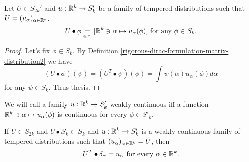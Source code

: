 \documentclass[main.tex]{subfiles}
\begin{document}
\begin{theorem}
\label{almost-tempered-representation}
Let $U\in S_{2k}'$ and $u:\mathbb{R}^k\to S_k'$ be a family of tempered distributions such that $U = (u_\alpha)_{\alpha\in\mathbb{R}^k}$.
\begin{equation}
U\bullet \phi \underset{\text{a.e.}}{=} [\mathbb{R}^k\ni\alpha\mapsto u_\alpha(\phi)] \text{ for any } \phi\in S_k.
\end{equation}
\begin{proof}
Let's fix $\phi\in S_k$. By Definition \ref{rigorous-dirac-formulation-matrix-distribution2} we have
\begin{equation}
(U\bullet\phi)(\psi) = (U^T\bullet\psi)(\phi) = \int \psi(\alpha) u_\alpha(\phi) d\alpha 
\end{equation}
for any $\psi\in S_k$. Thus thesis.
\end{proof}
\end{theorem}
\begin{definition}
We will call a family $u:\mathbb{R}^k\to S'_k$ weakly continuous iff
a function $\mathbb{R}^k\ni\alpha\mapsto u_\alpha(\phi)$ is continuous for every $\phi\in S'_k$. 
\end{definition}
\begin{theorem}
If $U\in S_{2k}$ and $U\bullet S_k \subset S_k$ and $u:\mathbb{R}^k\to S'_k$ is a weakly continuous family of tempered distributions such that $(u_\alpha)_{\alpha\in\mathbb{R}^k} = U$, then 
\begin{equation}
U^T \bullet \delta_\alpha = u_\alpha \text{ for every } \alpha\in\mathbb{R}^k.
\end{equation}
\end{theorem}
\end{document}
